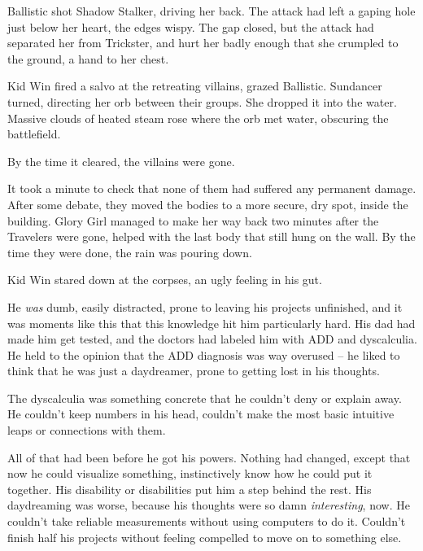 Ballistic shot Shadow Stalker, driving her back.  The attack had left a gaping hole just below her heart, the edges wispy.  The gap closed, but the attack had separated her from Trickster, and hurt her badly enough that she crumpled to the ground, a hand to her chest.



Kid Win fired a salvo at the retreating villains, grazed Ballistic.  Sundancer turned, directing her orb between their groups.  She dropped it into the water.  Massive clouds of heated steam rose where the orb met water, obscuring the battlefield.



By the time it cleared, the villains were gone.



It took a minute to check that none of them had suffered any permanent damage.  After some debate, they moved the bodies to a more secure, dry spot, inside the building. Glory Girl managed to make her way back two minutes after the Travelers were gone, helped with the last body that still hung on the wall.  By the time they were done, the rain was pouring down.



Kid Win stared down at the corpses, an ugly feeling in his gut.



He \emph{was} dumb, easily distracted, prone to leaving his projects unfinished, and it was moments like this that this knowledge hit him particularly hard.  His dad had made him get tested, and the doctors had labeled him with ADD and dyscalculia.  He held to the opinion that the ADD diagnosis was way overused – he liked to think that he was just a daydreamer, prone to getting lost in his thoughts.



The dyscalculia was something concrete that he couldn't deny or explain away.  He couldn't keep numbers in his head, couldn't make the most basic intuitive leaps or connections with them.



All of that had been before he got his powers.  Nothing had changed, except that now he could visualize something, instinctively know how he could put it together.  His disability or disabilities put him a step behind the rest.  His daydreaming was worse, because his thoughts were so damn \emph{interesting}, now.  He couldn't take reliable measurements without using computers to do it.  Couldn't finish half his projects without feeling compelled to move on to something else.



